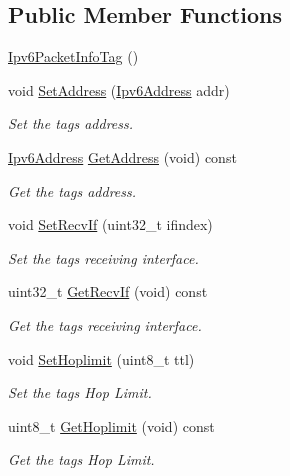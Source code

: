 \subsection*{Public Member Functions}
\begin{DoxyCompactItemize}
\item 
\hyperlink{classns3_1_1Ipv6PacketInfoTag_a03c75cc611f2e866ae73e48dbb6e8acf}{Ipv6\+Packet\+Info\+Tag} ()
\item 
void \hyperlink{classns3_1_1Ipv6PacketInfoTag_afaf59238457a2871401ff8b2bd487ed7}{Set\+Address} (\hyperlink{classns3_1_1Ipv6Address}{Ipv6\+Address} addr)
\begin{DoxyCompactList}\small\item\em Set the tag\textquotesingle{}s address. \end{DoxyCompactList}\item 
\hyperlink{classns3_1_1Ipv6Address}{Ipv6\+Address} \hyperlink{classns3_1_1Ipv6PacketInfoTag_ac3f0a6b0e5424183b6bc8716edc9ebfb}{Get\+Address} (void) const 
\begin{DoxyCompactList}\small\item\em Get the tag\textquotesingle{}s address. \end{DoxyCompactList}\item 
void \hyperlink{classns3_1_1Ipv6PacketInfoTag_aa59d4947709a0e6b92f19fb2c8b4ca8b}{Set\+Recv\+If} (uint32\+\_\+t ifindex)
\begin{DoxyCompactList}\small\item\em Set the tag\textquotesingle{}s receiving interface. \end{DoxyCompactList}\item 
uint32\+\_\+t \hyperlink{classns3_1_1Ipv6PacketInfoTag_a9555bccfe283d38dedd8d9bd844a2889}{Get\+Recv\+If} (void) const 
\begin{DoxyCompactList}\small\item\em Get the tag\textquotesingle{}s receiving interface. \end{DoxyCompactList}\item 
void \hyperlink{classns3_1_1Ipv6PacketInfoTag_ab325a17e8b1fc49ee64fcc1a20a8a6bb}{Set\+Hoplimit} (uint8\+\_\+t ttl)
\begin{DoxyCompactList}\small\item\em Set the tag\textquotesingle{}s Hop Limit. \end{DoxyCompactList}\item 
uint8\+\_\+t \hyperlink{classns3_1_1Ipv6PacketInfoTag_a031ef136ed2f71cc37d8ef1de7995905}{Get\+Hoplimit} (void) const 
\begin{DoxyCompactList}\small\item\em Get the tag\textquotesingle{}s Hop Limit. \end{DoxyCompactList}\item 

\end{DoxyCompactItemize}
